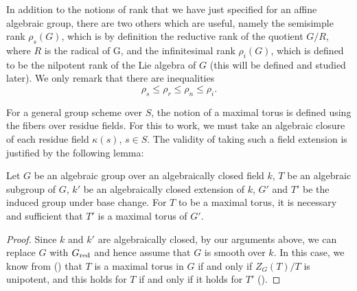 \begin{remark}
In addition to the notions of rank that we have just specified for an affine algebraic group, there are two others which are useful, namely the semisimple rank $\rho_s(G)$, which is by definition the reductive rank of the quotient $G/R$, where $R$ is the radical of G, and the infinitesimal rank $\rho_i(G)$, which is defined to be the nilpotent rank of the Lie algebra of $G$ (this will be defined and studied later). We only remark that there are inequalities
\[\rho_s\leq\rho_r\leq\rho_n\leq\rho_i.\]
\end{remark}

For a general group scheme over $S$, the notion of a maximal torus is defined using the fibers over residue fields. For this to work, we must take an algebraic closure of each residue field $\kappa(s)$, $s\in S$. The validity of taking such a field extension is justified by the following lemma:

\begin{lemma}\label{scheme alg group maximal torus iff base change}
Let $G$ be an algebraic group over an algebraically closed field $k$, $T$ be an algebraic subgroup of $G$, $k'$ be an algebraically closed extension of $k$, $G'$ and $T'$ be the induced group under base change. For $T$ to be a maximal torus, it is necessary and sufficient that $T'$ is a maximal torus of $G'$.
\end{lemma}
\begin{proof}
Since $k$ and $k'$ are algebraically closed, by our arguments above, we can replace $G$ with $G_{\mathrm{red}}$ and hence assume that $G$ is smooth over $k$. In this case, we know from (\cite{Chevalley1958}) that $T$ is a maximal torus in $G$ if and only if $Z_G(T)/T$ is unipotent, and this holds for $T$ if and only if it holds for $T'$ (\cite{Chevalley1958}).
\end{proof}


